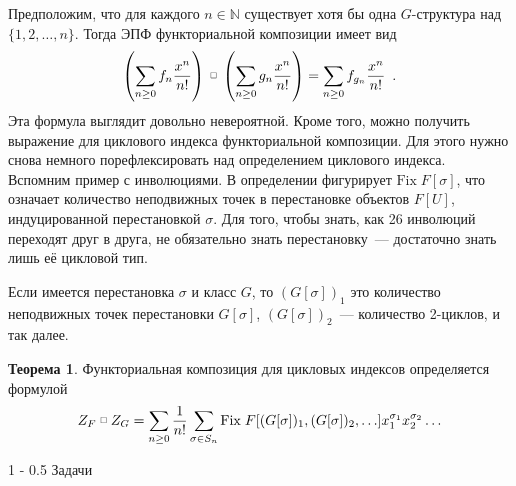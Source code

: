 \documentclass{article}
\makeatletter
\def \fprod {\; \raisebox{.3\height}{\scalebox{0.6}{$\square$}}\; }
\theoremstyle{definition}
\newtheorem*{theorem}{Теорема}
\renewcommand{\section}{\@startsection
{section}%
{1}%
{\z@}%
{-\baselineskip}%
{0.5\baselineskip}%
{\centering\large\scshape}} %
\makeatother
\begin{document}
Предположим, что для каждого \( n \in \mathbb N \) существует хотя бы одна \( G
\)-структура над \( \{1,2,\ldots, n\} \). Тогда ЭПФ функториальной композиции
имеет вид
\[
    \left(
    \sum_{n \geq 0} f_n \dfrac{x^n}{n!}
    \right)
    \fprod
    \left(
    \sum_{n \geq 0} g_n \dfrac{x^n}{n!}
    \right)
    = 
    \sum_{n \geq 0} f_{g_n} \dfrac{x^n}{n!} \enspace .
\]
Эта формула выглядит довольно невероятной. Кроме того, можно получить выражение
для циклового индекса функториальной композиции. Для этого нужно снова немного
порефлексировать над определением циклового индекса. Вспомним пример с
инволюциями. В определении фигурирует \(
\mathrm{Fix}\;F[\sigma]\), что означает количество неподвижных точек в
перестановке объектов \( F[U] \), индуцированной перестановкой \( \sigma \). Для
того, чтобы знать, как 26 инволюций переходят друг в друга, не обязательно знать
перестановку~--- достаточно знать лишь её цикловой тип.

Если имеется перестановка \(\sigma \) и класс \( G \), то \( (G[\sigma])_1 \)
это количество неподвижных точек перестановки \( G[\sigma] \), \( (G[\sigma])_2
\)~--- количество 2-циклов, и так далее.

\begin{theorem}
    Функториальная композиция для цикловых индексов определяется формулой
\[
    Z_F \fprod Z_G = \sum_{n \geq 0 } \dfrac{1}{n!} \sum_{\sigma \in S_n}
    \mathrm{Fix}\; F[(G[\sigma])_1, (G[\sigma])_2,
\ldots]x_1^{\sigma_1}x_2^{\sigma_2} \ldots
\]
\end{theorem}

\section{Задачи}
\end{document}
